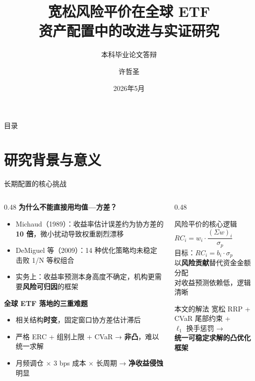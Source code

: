 \documentclass[aspectratio=169,11pt]{beamer}
\title{宽松风险平价在全球 ETF\\资产配置中的改进与实证研究}
\subtitle{本科毕业论文答辩}
\author{许哲圣}
\date{2026年5月}
\newcommand{\txCostBps}{3}
\begin{document}
\begin{frame}\titlepage\end{frame}

\begin{frame}{目录}\tableofcontents\end{frame}

\section{研究背景与意义}

\begin{frame}{长期配置的核心挑战}
  \begin{columns}[T]
    \begin{column}{0.48\textwidth}
      \textbf{为什么不能直接用均值—方差？}
      \begin{itemize}
        \item Michaud（1989）：收益率估计误差约为协方差的 \textbf{10 倍}，微小扰动导致权重剧烈漂移
        \item DeMiguel 等（2009）：14 种优化策略均未稳定击败 1/N 等权组合
        \item 实务上：收益率预测本身高度不确定，机构更需要\textbf{风险可归因}的框架
      \end{itemize}
      \vspace{0.4em}
      \textbf{全球 ETF 落地的三重难题}
      \begin{itemize}
        \item 相关结构\textbf{时变}，固定窗口协方差估计滞后
        \item 严格 ERC + 组别上限 + CVaR → \textbf{非凸}，难以统一求解
        \item 月频调仓 × \txCostBps{} bps 成本 × 长周期 → \textbf{净收益侵蚀}明显
      \end{itemize}
    \end{column}
    \begin{column}{0.48\textwidth}
      \begin{block}{风险平价的核心逻辑}
        \centering\large
        $RC_i = w_i \cdot \dfrac{(\Sigma w)_i}{\sigma_p}$\\[0.5em]
        \normalsize 目标：$RC_i = b_i \cdot \sigma_p$\\[0.3em]
        \small 以\textbf{风险贡献}替代资金金额分配\\
        对收益预测依赖低，逻辑清晰
      \end{block}
      \vspace{0.4em}
      \begin{alertblock}{本文的解法}
        宽松 RRP + CVaR 尾部约束 +\\
        $\ell_1$ 换手惩罚 →\\
        \textbf{统一可稳定求解的凸优化框架}
      \end{alertblock}
    \end{column}
  \end{columns}
\end{frame}
\end{document}
